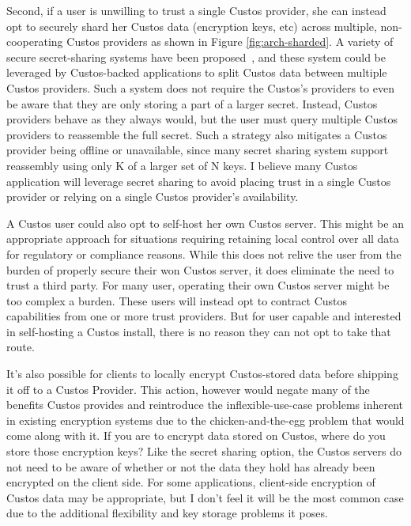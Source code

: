Second, if a user is unwilling to trust a single Custos provider, she
can instead opt to securely shard her Custos data (encryption keys,
etc) across multiple, non-cooperating Custos providers as shown in
Figure \ref{fig:arch-sharded}. A variety of secure secret-sharing
systems have been proposed~\cite{Shamir1979, Resch2011, Krawczyk1993},
and these system could be leveraged by Custos-backed applications to
split Custos data between multiple Custos providers. Such a system
does not require the Custos's providers to even be aware that they are
only storing a part of a larger secret. Instead, Custos providers
behave as they always would, but the user must query multiple Custos
providers to reassemble the full secret. Such a strategy also
mitigates a Custos provider being offline or unavailable, since many
secret sharing system support reassembly using only K of a larger set
of N keys. I believe many Custos application will leverage secret
sharing to avoid placing trust in a single Custos provider or relying
on a single Custos provider's availability.

A Custos user could also opt to self-host her own Custos server. This
might be an appropriate approach for situations requiring retaining
local control over all data for regulatory or compliance
reasons. While this does not relive the user from the burden of
properly secure their won Custos server, it does eliminate the need to
trust a third party. For many user, operating their own Custos server
might be too complex a burden. These users will instead opt to
contract Custos capabilities from one or more trust providers. But for
user capable and interested in self-hosting a Custos install, there is
no reason they can not opt to take that route.

It's also possible for clients to locally encrypt Custos-stored data
before shipping it off to a Custos Provider. This action, however
would negate many of the benefits Custos provides and reintroduce the
inflexible-use-case problems inherent in existing encryption systems
due to the chicken-and-the-egg problem that would come along with
it. If you are to encrypt data stored on Custos, where do you store
those encryption keys? Like the secret sharing option, the Custos
servers do not need to be aware of whether or not the data they hold
has already been encrypted on the client side. For some applications,
client-side encryption of Custos data may be appropriate, but I don't
feel it will be the most common case due to the additional flexibility
and key storage problems it poses.

